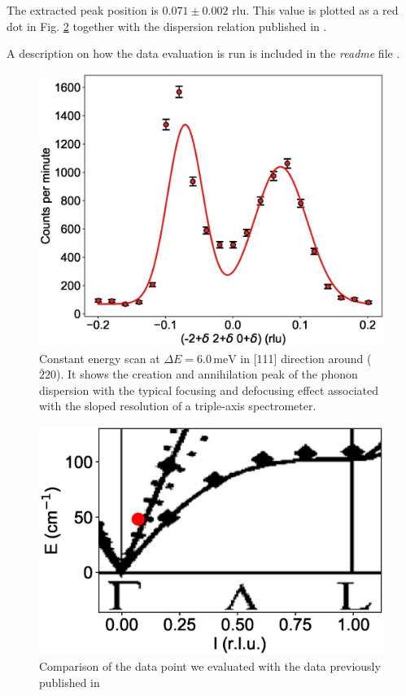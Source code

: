 \documentclass[aps,reprint,amsmath,amssymb,superscriptaddress]{revtex4-1}
\begin{document}
The extracted peak position is $0.071 \pm  0.002$ rlu. 
This value is plotted as a red dot in Fig. \ref{fig2} together with the dispersion relation published in \cite{Aouissi}.

A description on how the data evaluation is run is included in the \emph{readme} file \cite{data-evaluation}.


\begin{figure}
    \includegraphics[width=1.0\linewidth]{energy-scan.eps}
    \caption{\label{fig1} Constant energy scan at $\Delta E = 6.0\,\mathrm{meV}$ in [111] direction around ($\bar{2}20$). It shows the creation and annihilation peak of the phonon dispersion with the typical focusing and defocusing effect associated with the sloped resolution of a triple-axis spectrometer.}
\end{figure}

\begin{figure}
    \includegraphics[width=1.0\linewidth]{dispersion.eps}
    \caption{Comparison of the data point we evaluated with the data previously published in \cite{Aouissi} }
    \label{fig2}
\end{figure}
\end{document}
